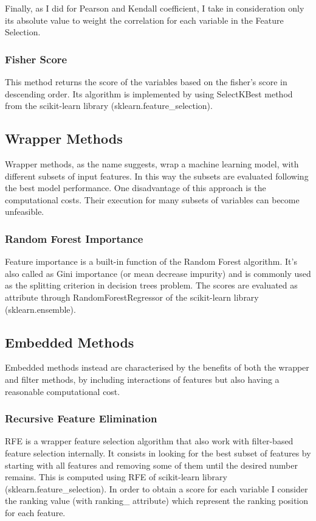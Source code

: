 Finally, as I did for Pearson and Kendall coefficient, I take in consideration only its absolute value to weight the correlation for each variable in the Feature Selection.

\subsubsection{Fisher Score}
This method returns the score of the variables based on the fisher’s score in descending order. \newline
Its algorithm is implemented by using SelectKBest method from the scikit-learn library (sklearn.feature\_selection).
\pagebreak
\subsection{Wrapper Methods}
Wrapper methods, as the name suggests, wrap a machine learning model, with different subsets of input features. In this way the subsets are evaluated following the best model performance.
One disadvantage of this approach is the computational costs.\newline
Their execution for many subsets of variables can become unfeasible. 
\bigbreak
\subsubsection{Random Forest Importance}
Feature importance is a built-in function of the Random Forest algorithm. It's also called as Gini importance (or mean decrease impurity) and is commonly used as the splitting criterion in decision trees problem. The scores are evaluated as attribute through RandomForestRegressor of the scikit-learn library (sklearn.ensemble).
\bigbreak\bigbreak\bigbreak
\subsection{Embedded Methods}
Embedded methods instead are characterised by the benefits of both the wrapper and filter methods, by including interactions of features but also having a reasonable computational cost.\par
\bigskip
\subsubsection{Recursive Feature Elimination}
RFE is a wrapper feature selection algorithm that also work with filter-based feature selection internally.\newline
It consists in looking for the best subset of features by starting with all features and removing some of them until the desired number remains.\newline
This is computed using RFE of scikit-learn library (sklearn.feature\_selection).
In order to obtain a score for each variable I consider the ranking value (with ranking\_ attribute) which represent the ranking position for each feature. 
\pagebreak

